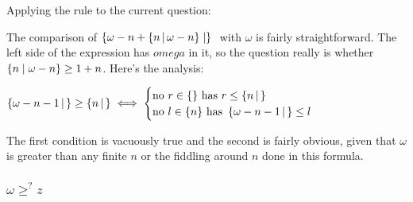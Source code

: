 \noindent Applying the rule to the current question:


The comparison of $\surrealinline{\omega - n + \surreal{n}{\omega - n}}$ with $\omega$ is fairly straightforward.  The left side of the expression has $omega$ in it, so the question really is whether $\{n \mid \omega - n\}\geq 1 + n$.  Here's the analysis:

$\left\{\omega - n - 1 \,\middle|\, \right\} \geq \left\{n \,\middle|\, \right\} \iff \begin{cases} \text{no } r \in \{\} \text{ has } r \leq \left\{n \,\middle|\, \right\} \\ \text{no } l \in \{n\} \text{ has } \left\{\omega - n - 1 \,\middle|\, \right\} \leq l \end{cases}$

The first condition is vacuously true and the second is fairly obvious, given that $\omega$ is greater than any finite $n$ or the fiddling around $n$ done in this formula.

\subsubsection*{$\omega \ge^? z$}